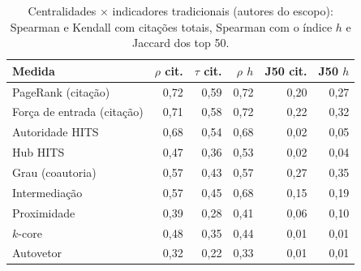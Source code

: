 \begin{table}[htbp]
\centering
\small
\caption{Centralidades $\times$ indicadores tradicionais (autores do escopo): Spearman e Kendall com citações totais, Spearman com o índice $h$ e Jaccard dos top 50.}
\label{tab:centralidade}
\begin{tabular}{lrrrrr}
\hline
Medida & $\rho$ cit. & $\tau$ cit. & $\rho$ $h$ & J50 cit. & J50 $h$ \\
\hline
PageRank (citação) & 0{,}72 & 0{,}59 & 0{,}72 & 0{,}20 & 0{,}27 \\
Força de entrada (citação) & 0{,}71 & 0{,}58 & 0{,}72 & 0{,}22 & 0{,}32 \\
Autoridade HITS & 0{,}68 & 0{,}54 & 0{,}68 & 0{,}02 & 0{,}05 \\
Hub HITS & 0{,}47 & 0{,}36 & 0{,}53 & 0{,}02 & 0{,}04 \\
Grau (coautoria) & 0{,}57 & 0{,}43 & 0{,}57 & 0{,}27 & 0{,}35 \\
Intermediação & 0{,}57 & 0{,}45 & 0{,}68 & 0{,}15 & 0{,}19 \\
Proximidade & 0{,}39 & 0{,}28 & 0{,}41 & 0{,}06 & 0{,}10 \\
$k$-core & 0{,}48 & 0{,}35 & 0{,}44 & 0{,}01 & 0{,}01 \\
Autovetor & 0{,}32 & 0{,}22 & 0{,}33 & 0{,}01 & 0{,}01 \\
\hline
\end{tabular}
\end{table}
